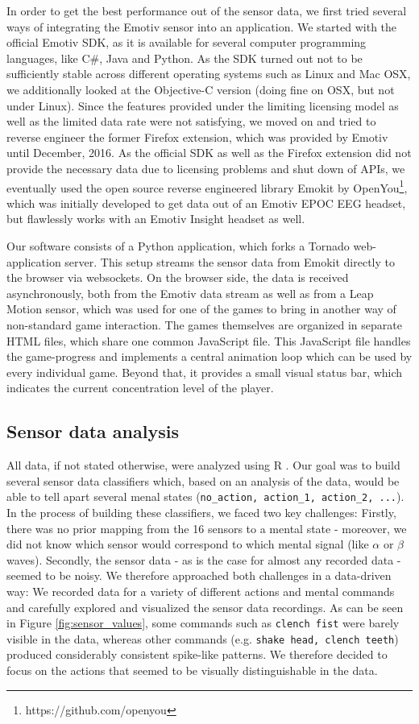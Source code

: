 \documentclass{utue} %
\begin{document}
In order to get the best performance out of the sensor data, we first tried several ways of integrating the Emotiv sensor into an application. We started with the official Emotiv SDK, as it is available for several computer programming languages, like C\#, Java and Python. As the SDK turned out not to be sufficiently stable across different operating systems such as Linux and Mac OSX, we additionally looked at the Objective-C version (doing fine on OSX, but not under Linux). Since the features provided under the limiting licensing model as well as the limited data rate were not satisfying, we moved on and tried to reverse engineer the former Firefox extension, which was provided by Emotiv until December, 2016. As the official SDK as well as the Firefox extension did not provide the necessary data due to licensing problems and shut down of APIs, we eventually used the open source reverse engineered library Emokit by OpenYou\footnote{https://github.com/openyou}, which was initially developed to get data out of an Emotiv EPOC EEG headset, but flawlessly works with an Emotiv Insight headset as well.

Our software consists of a Python application, which forks a Tornado web-application server. This setup streams the sensor data from Emokit directly to the browser via websockets. On the browser side, the data is received asynchronously, both from the Emotiv data stream as well as from a Leap Motion sensor, which was used for one of the games to bring in another way of non-standard game interaction. The games themselves are organized in separate HTML files, which share one common JavaScript file. This JavaScript file handles the game-progress and implements a central animation loop which can be used by every individual game. Beyond that, it provides a small visual status bar, which indicates the current concentration level of the player.

\subsection{Sensor data analysis}
All data, if not stated otherwise, were analyzed using R \cite{RCoreTeam}. Our goal was to build several sensor data classifiers which, based on an analysis of the data, would be able to tell apart several menal states (\texttt{no\_action, action\_1, action\_2, ...}). In the process of building these classifiers, we faced two key challenges: Firstly, there was no prior mapping from the 16 sensors to a mental state - moreover, we did not know which sensor would correspond to which mental signal (like $ \alpha $ or $ \beta $ waves). Secondly, the sensor data - as is the case for almost any recorded data - seemed to be noisy. We therefore approached both challenges in a data-driven way: We recorded data for a variety of different actions and mental commands and carefully explored and visualized the sensor data recordings. As can be seen in Figure \ref{fig:sensor_values}, some commands such as \texttt{clench fist} were barely visible in the data, whereas other commands (e.g. \texttt{shake head, clench teeth}) produced considerably consistent spike-like patterns. We therefore decided to focus on the actions that seemed to be visually distinguishable in the data.
\end{document}
